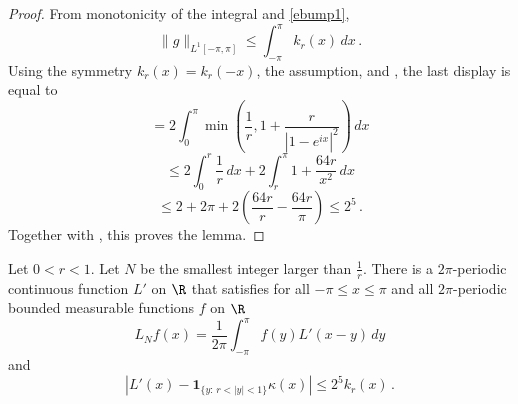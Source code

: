 \begin{proof}
From monotonicity of the integral and \eqref{ebump1},
\begin{equation}
    \|g\|_{L^1[-\pi, \pi]} \le \int_{-\pi}^{\pi}k_r(x)\, dx\,.
\end{equation}
Using the symmetry
$k_r(x)=k_r(-x)$, the assumption, and , the last display
is equal to
\begin{equation*}
    = 2 \int_0^\pi \min\left(\frac 1r, 1+\frac r{|1-e^{ix}|^2}\right)\, dx
\end{equation*}
\begin{equation*}
    \le 2\int_0^{r} \frac 1r \, dx+2\int_r^{\pi}1+\frac {64r}{x^2}\, dx
\end{equation*}
\begin{equation}
    \le 2+2\pi + 2\left(\frac {64r}r-\frac {64r}{\pi}\right)
    \le 2^{5}\, .
\end{equation}
    Together with , this proves the lemma.
\end{proof}

\begin{lemma}\label{dirichlet-approximation}
Let $0<r<1$. Let $N$ be the smallest
integer larger than $\frac 1r$.
There is a $2\pi$-periodic continuous function
 ${L'}$ on $\R$ that satisfies for all $-\pi\le x\le \pi$
and all $2\pi$-periodic bounded measurable functions $f$ on $\R$
\begin{equation}\label{lthroughlprime}
    L_Nf(x)=\frac 1{2\pi}\int_{-\pi}^{\pi}f(y) {L'}(x-y)\, dy
\end{equation}
and
\begin{equation}\label{eqdifflhil}
    \left|L'(x)-\mathbf{1}_{\{y:\, r<|y|<1\}} \kappa(x)\right|\le 2^{5}k_r(x)\, .
\end{equation}
\end{lemma}


